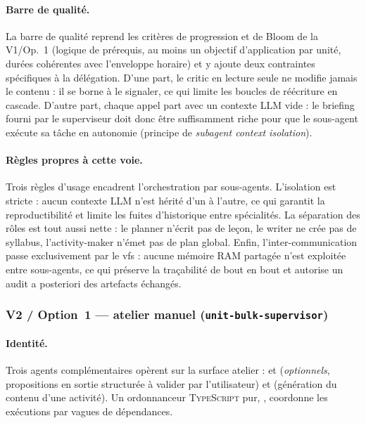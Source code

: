 \paragraph{Barre de qualité.} La barre de qualité reprend les
critères de progression et de Bloom de la V1/Op.~1 (logique de
prérequis, au moins un objectif d'application par unité, durées
cohérentes avec l'enveloppe horaire) et y ajoute deux contraintes
spécifiques à la délégation. D'une part, le critic en lecture seule
ne modifie jamais le contenu : il se borne à le signaler, ce qui
limite les boucles de réécriture en cascade. D'autre part, chaque
appel  part avec un contexte LLM vide : le briefing
fourni par le superviseur doit donc être suffisamment riche pour
que le sous-agent exécute sa tâche en autonomie (principe de
\emph{subagent context isolation}).

\paragraph{Règles propres à cette voie.} Trois règles d'usage
encadrent l'orchestration par sous-agents. L'isolation est stricte :
aucun contexte LLM n'est hérité d'un  à l'autre, ce
qui garantit la reproductibilité et limite les fuites d'historique
entre spécialités. La séparation des rôles est tout aussi nette :
le planner n'écrit pas de leçon, le writer ne crée pas de syllabus,
l'activity-maker n'émet pas de plan global. Enfin, l'inter-communication
passe exclusivement par le \gls{vfs} : aucune mémoire RAM
partagée n'est exploitée entre sous-agents, ce qui préserve la
traçabilité de bout en bout et autorise un audit a posteriori des
artefacts échangés.

\subsubsection{V2 / Option~1 — atelier manuel
  (\texttt{unit-bulk-supervisor})}
\label{sec:v2-op1}

\paragraph{Identité.} Trois agents complémentaires opèrent sur la
surface atelier :  et
 (\emph{optionnels}, propositions en
sortie structurée à valider par l'utilisateur) et
 (génération du contenu d'une
activité). Un ordonnanceur \textsc{TypeScript} pur,
, coordonne les exécutions par vagues de
dépendances.

